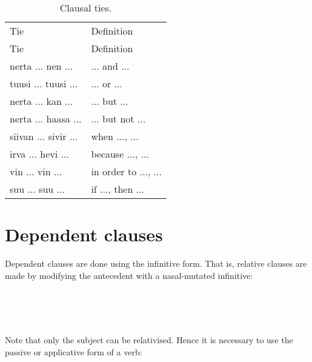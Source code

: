 \documentclass{book}
\begin{document}
\begin{longtabu}[c]{|X|X|}
    \caption{Clausal ties.}
    \centering
    
    \\ \hline
    Tie & Definition \\
    \hline
    \endfirsthead
    
    \hline
    Tie & Definition \\
    \hline
    \endhead
    
    \hline
    \endfoot
    
    \hline
    \endlastfoot
    
    nerta ... nen ... & ... and ... \\
    tuusi ... tuusi ... & ... or ... \\
    nerta ... kan ... & ... but ... \\
    nerta ... haasa ... & ... but not ... \\
    siivan ... sivir ... & when ..., ... \\
    irva ... hevi ... & because ..., ... \\
    vin ... vin ... & in order to ..., ... \\
    suu ... suu ... & if ..., then ... \\
\end{longtabu}

\section{Dependent clauses}

Dependent clauses are done using the infinitive form. That is, relative clauses are made by modifying the antecedent with a nasal-mutated infinitive:

~ \\
    \\
    \\
   

Note that only the subject can be relativised. Hence it is necessary to use the passive or applicative form of a verb:

~ \\
      \\
      \\
    \\
~ \\
       \\
       \\
    
\end{document}
